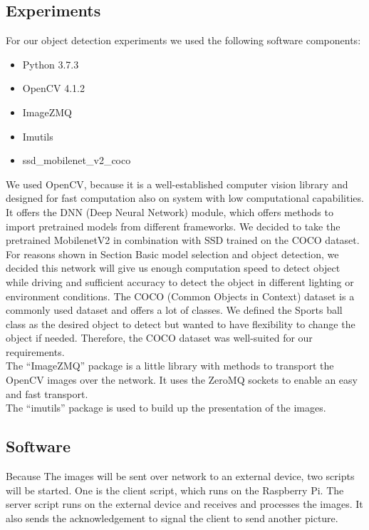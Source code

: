 \subsection{Experiments}

For our object detection experiments we used the following software components:

\begin{itemize}
\itemsep0em
\item Python 3.7.3
\item OpenCV 4.1.2 \cite{tim6}
\item ImageZMQ \cite{tim7}
\item Imutils \cite{tim8}
\item ssd\_mobilenet\_v2\_coco \cite{tim9}
\end{itemize}

We used OpenCV, because it is a well-established computer vision library and designed for fast computation also on system with low computational capabilities. It offers the DNN (Deep Neural Network) module, which offers methods to import pretrained models from different frameworks. We decided to take the pretrained MobilenetV2 in combination with SSD trained on the COCO dataset. For reasons shown in Section Basic model selection and object detection, we decided this network will give us enough computation speed to detect object while driving and sufficient accuracy to detect the object in different lighting or environment conditions. The COCO (Common Objects in Context) dataset is a commonly used dataset and offers a lot of classes. We defined the Sports ball class as the desired object to detect but wanted to have flexibility to change the object if needed. Therefore, the COCO dataset was well-suited for our requirements.\\

The ``ImageZMQ'' package is a little library with methods to transport the OpenCV images over the network. It uses the ZeroMQ sockets to enable an easy and fast transport.\\

The ``imutils'' package is used to build up the presentation of the images.

\subsection{Software}

Because The images will be sent over network to an external device, two scripts will be started. One is the client script, which runs on the Raspberry Pi. The server script runs on the external device and receives and processes the images. It also sends the acknowledgement to signal the client to send another picture.

